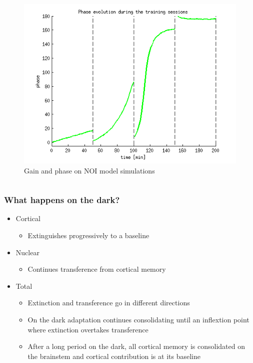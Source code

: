 \documentclass[10pt, compress]{beamer}
\begin{document}
\begin{frame}[fragile]
\begin{columns}[onlytextwidth]
\begin{figure}
      \newline
      \includegraphics[scale=0.25]{images/longnoi_13.png}
      \caption{Gain and phase on NOI model simulations}
    \end{figure}
  \end{columns}
\end{frame}

\begin{frame}[fragile]
  \frametitle{What happens on the dark?}
  \begin{itemize}
    \item Cortical
      \begin{itemize}
        \item Extinguishes progressively to a baseline
      \end{itemize}
    \item Nuclear
      \begin{itemize}
        \item Continues transference from cortical memory
      \end{itemize}
    \item Total
      \begin{itemize}
        \item Extinction and transference go in different directions
        \item On the dark adaptation continues consolidating until an inflextion point where extinction overtakes transference
        \item After a long period on the dark, all cortical memory is consolidated on the brainstem and cortical contribution is at its baseline
      \end{itemize}
  \end{itemize}
\end{frame}
\end{document}
